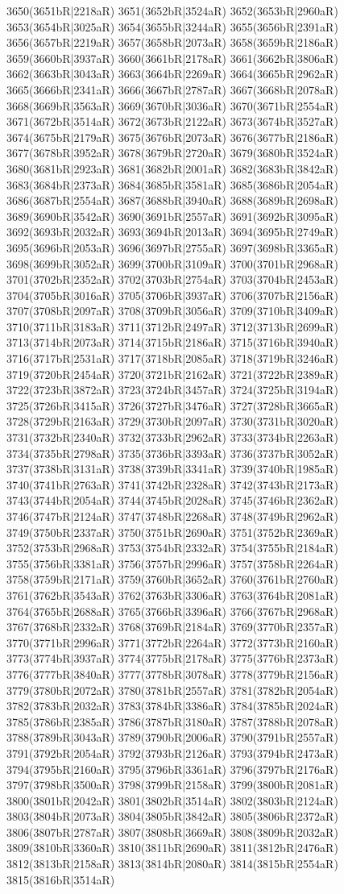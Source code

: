 3650(3651bR|2218aR) 3651(3652bR|3524aR) 3652(3653bR|2960aR) 3653(3654bR|3025aR) 3654(3655bR|3244aR) 3655(3656bR|2391aR) 3656(3657bR|2219aR) 3657(3658bR|2073aR) 3658(3659bR|2186aR) 3659(3660bR|3937aR) 3660(3661bR|2178aR) 3661(3662bR|3806aR) 3662(3663bR|3043aR) 3663(3664bR|2269aR) 3664(3665bR|2962aR) 3665(3666bR|2341aR) 3666(3667bR|2787aR) 3667(3668bR|2078aR) 3668(3669bR|3563aR) 3669(3670bR|3036aR) 3670(3671bR|2554aR) 3671(3672bR|3514aR) 3672(3673bR|2122aR) 3673(3674bR|3527aR) 3674(3675bR|2179aR) 3675(3676bR|2073aR) 3676(3677bR|2186aR) 3677(3678bR|3952aR) 3678(3679bR|2720aR) 3679(3680bR|3524aR) 3680(3681bR|2923aR) 3681(3682bR|2001aR) 3682(3683bR|3842aR) 3683(3684bR|2373aR) 3684(3685bR|3581aR) 3685(3686bR|2054aR) 3686(3687bR|2554aR) 3687(3688bR|3940aR) 3688(3689bR|2698aR) 3689(3690bR|3542aR) 3690(3691bR|2557aR) 3691(3692bR|3095aR) 3692(3693bR|2032aR) 3693(3694bR|2013aR) 3694(3695bR|2749aR) 3695(3696bR|2053aR) 3696(3697bR|2755aR) 3697(3698bR|3365aR) 3698(3699bR|3052aR) 3699(3700bR|3109aR) 3700(3701bR|2968aR) 3701(3702bR|2352aR) 3702(3703bR|2754aR) 3703(3704bR|2453aR) 3704(3705bR|3016aR) 3705(3706bR|3937aR) 3706(3707bR|2156aR) 3707(3708bR|2097aR) 3708(3709bR|3056aR) 3709(3710bR|3409aR) 3710(3711bR|3183aR) 3711(3712bR|2497aR) 3712(3713bR|2699aR) 3713(3714bR|2073aR) 3714(3715bR|2186aR) 3715(3716bR|3940aR) 3716(3717bR|2531aR) 3717(3718bR|2085aR) 3718(3719bR|3246aR) 3719(3720bR|2454aR) 3720(3721bR|2162aR) 3721(3722bR|2389aR) 3722(3723bR|3872aR) 3723(3724bR|3457aR) 3724(3725bR|3194aR) 3725(3726bR|3415aR) 3726(3727bR|3476aR) 3727(3728bR|3665aR) 3728(3729bR|2163aR) 3729(3730bR|2097aR) 3730(3731bR|3020aR) 3731(3732bR|2340aR) 3732(3733bR|2962aR) 3733(3734bR|2263aR) 3734(3735bR|2798aR) 3735(3736bR|3393aR) 3736(3737bR|3052aR) 3737(3738bR|3131aR) 3738(3739bR|3341aR) 3739(3740bR|1985aR) 3740(3741bR|2763aR) 3741(3742bR|2328aR) 3742(3743bR|2173aR) 3743(3744bR|2054aR) 3744(3745bR|2028aR) 3745(3746bR|2362aR) 3746(3747bR|2124aR) 3747(3748bR|2268aR) 3748(3749bR|2962aR) 3749(3750bR|2337aR) 3750(3751bR|2690aR) 3751(3752bR|2369aR) 3752(3753bR|2968aR) 3753(3754bR|2332aR) 3754(3755bR|2184aR) 3755(3756bR|3381aR) 3756(3757bR|2996aR) 3757(3758bR|2264aR) 3758(3759bR|2171aR) 3759(3760bR|3652aR) 3760(3761bR|2760aR) 3761(3762bR|3543aR) 3762(3763bR|3306aR) 3763(3764bR|2081aR) 3764(3765bR|2688aR) 3765(3766bR|3396aR) 3766(3767bR|2968aR) 3767(3768bR|2332aR) 3768(3769bR|2184aR) 3769(3770bR|2357aR) 3770(3771bR|2996aR) 3771(3772bR|2264aR) 3772(3773bR|2160aR) 3773(3774bR|3937aR) 3774(3775bR|2178aR) 3775(3776bR|2373aR) 3776(3777bR|3840aR) 3777(3778bR|3078aR) 3778(3779bR|2156aR) 3779(3780bR|2072aR) 3780(3781bR|2557aR) 3781(3782bR|2054aR) 3782(3783bR|2032aR) 3783(3784bR|3386aR) 3784(3785bR|2024aR) 3785(3786bR|2385aR) 3786(3787bR|3180aR) 3787(3788bR|2078aR) 3788(3789bR|3043aR) 3789(3790bR|2006aR) 3790(3791bR|2557aR) 3791(3792bR|2054aR) 3792(3793bR|2126aR) 3793(3794bR|2473aR) 3794(3795bR|2160aR) 3795(3796bR|3361aR) 3796(3797bR|2176aR) 3797(3798bR|3500aR) 3798(3799bR|2158aR) 3799(3800bR|2081aR) 3800(3801bR|2042aR) 3801(3802bR|3514aR) 3802(3803bR|2124aR) 3803(3804bR|2073aR) 3804(3805bR|3842aR) 3805(3806bR|2372aR) 3806(3807bR|2787aR) 3807(3808bR|3669aR) 3808(3809bR|2032aR) 3809(3810bR|3360aR) 3810(3811bR|2690aR) 3811(3812bR|2476aR) 3812(3813bR|2158aR) 3813(3814bR|2080aR) 3814(3815bR|2554aR) 3815(3816bR|3514aR) 